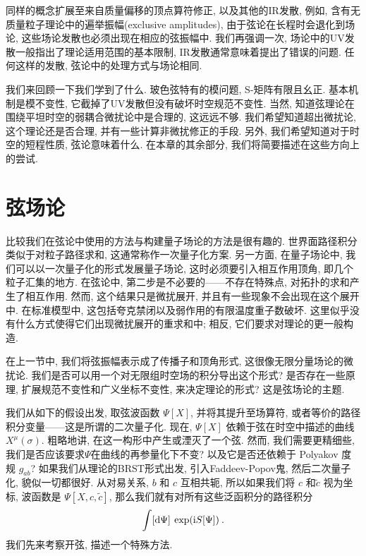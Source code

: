 同样的概念扩展至来自质量偏移的顶点算符修正, 以及其他的IR发散, 例如, 含有无质量粒子理论中的遍举振幅(exclusive amplitudes), 由于弦论在长程时会退化到场论, 
这些场论发散也必须出现在相应的弦振幅中. 我们再强调一次, 场论中的UV发散一般指出了理论适用范围的基本限制, IR发散通常意味着提出了错误的问题. 
任何这样的发散, 弦论中的处理方式与场论相同.

我们来回顾一下我们学到了什么. 玻色弦特有的模问题, S-矩阵有限且幺正. 基本机制是模不变性, 它截掉了UV发散但没有破坏时空规范不变性. 
当然, 知道弦理论在围绕平坦时空的弱耦合微扰论中是合理的, 这远远不够. 我们希望知道超出微扰论, 这个理论还是否合理, 并有一些计算非微扰修正的手段. 
另外, 我们希望知道对于时空的短程性质, 弦论意味着什么. 在本章的其余部分, 我们将简要描述在这些方向上的尝试.

\section{弦场论} \label{sec:9.6}%

比较我们在弦论中使用的方法与构建量子场论的方法是很有趣的. 世界面路径积分类似于对粒子路径求和, 这通常称作一次量子化方案. 另一方面, 在量子场论中, 我们可以以一次量子化的形式发展量子场论, 这时必须要引入相互作用顶角, 即几个粒子汇集的地方. 在弦论中, 第二步是不必要的——不存在特殊点, 对拓扑的求和产生了相互作用. 
然而, 这个结果只是微扰展开, 并且有一些现象不会出现在这个展开中. 在标准模型中, 这包括夸克禁闭以及弱作用的有限温度重子数破坏. 
这里似乎没有什么方式使得它们出现微扰展开的重求和中; 相反, 它们要求对理论的更一般构造.

在上一节中, 我们将弦振幅表示成了传播子和顶角形式, 这很像无限分量场论的微扰论. 
我们是否可以用一个对无限组时空场的积分导出这个形式? 是否存在一些原理, 扩展规范不变性和广义坐标不变性, 来决定理论的形式? 
这是弦场论的主题.

我们从如下的假设出发, 取弦波函数 $\Psi[X]$, 并将其提升至场算符, 或者等价的路径积分变量——这是所谓的二次量子化. 
现在, $\Psi[X]$ 依赖于弦在时空中描述的曲线$X^{\mu}(\sigma)$. 粗略地讲, 在这一构形中产生或湮灭了一个弦. 
然而, 我们需要更精细些, 我们是否应该要求$\Psi$在曲线的再参量化下不变? 以及它是否还依赖于 Polyakov 度规 $g_{ab}$? 
如果我们从理论的BRST形式出发, 引入Faddeev-Popov鬼, 然后二次量子化, 貌似一切都很好. 
从对易关系, $b$ 和 $c$ 互相共轭, 所以如果我们将 $c$ 和$\tilde{c}$ 视为坐标, 波函数是 $\Psi[X, c, \tilde{c}]$, 
那么我们就有对所有这些泛函积分的路径积分
\begin{equation}
	\int[\mathrm{d} \Psi] \: \exp (\mathrm{i} S[\Psi]) \:. \label{9.6.1}
\end{equation}
我们先来考察开弦, 描述一个特殊方法. 

